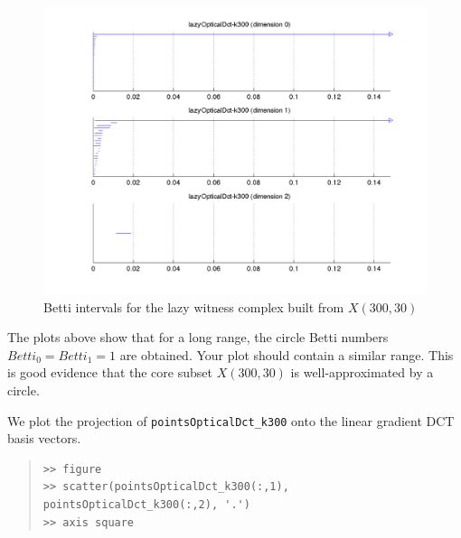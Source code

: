 \documentclass[amscd, amssymb, verbatim]{amsart}[12pt]
\theoremstyle{remark}
\theoremstyle{remark}
\theoremstyle{remark}
\begin{document}
\begin{figure}[htp]
	\begin{center}
    	\includegraphics[width=6in]{lazyOpticalDct-k300.png}
   	\end{center}
	\caption{Betti intervals for the lazy witness complex built from $X(300,30)$}
  	\label{fig:rangeBetti}
\end{figure}
\FloatBarrier

The plots above show that for a long range, the circle Betti numbers $Betti_0 = Betti_1 = 1$ are obtained. Your plot should contain a similar range. This is good evidence that the core subset $X(300,30)$ is well-approximated by a circle. 

We plot the projection of \texttt{pointsOpticalDct\_k300} onto the linear gradient DCT basis vectors.

\begin{quote} \begin{verbatim}
>> figure
>> scatter(pointsOpticalDct_k300(:,1), pointsOpticalDct_k300(:,2), '.')
>> axis square
\end{verbatim} \end{quote}
\end{document}
